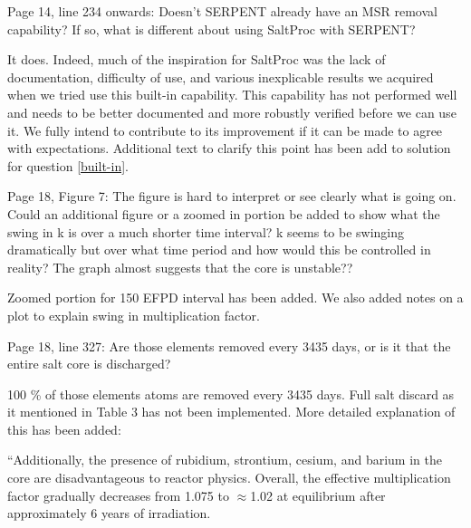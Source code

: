 \documentclass[answers,11pt]{exam}
\begin{document}
\begin{questions}
        \question  Page 14, line 234 onwards: Doesn't SERPENT already have an 
        MSR removal capability? If so, what is different about using SaltProc 
        with SERPENT?
        \begin{solution}
                It does. Indeed, much of the inspiration for SaltProc was the 
                lack of documentation, difficulty of use, and various 
                inexplicable results we acquired when we tried use this 
                built-in capability. This capability has not performed well and 
                needs to be better documented and more robustly verified before 
                we can use it. We fully intend to contribute to its improvement 
                if it can be made to agree with expectations.  Additional text 
                to clarify this point has been add to solution for question 
                \ref{built-in}.                
        \end{solution}

        \question  Page 18, Figure 7: The figure is hard to interpret or see 
        clearly what is going on. Could an additional figure or a zoomed in 
        portion be added to show what the swing in k is over a much shorter 
        time interval? k seems to be swinging dramatically but over what time 
        period and how would this be controlled in reality? The graph almost 
        suggests that the core is unstable??
        \begin{solution}
                Zoomed portion for 150 EFPD interval has been added. We also 
                added notes on a plot to explain swing in multiplication factor.
        \end{solution}

        \question  Page 18, line 327: Are those elements removed every 3435 
        days, or is it that the entire salt core is discharged?
        \begin{solution}
		        100 \% of those elements atoms are removed every 3435 
                        days. Full salt discard
		         as it mentioned in Table 3 has not been implemented. More detailed 
		         explanation of this has been added:


                        ``Additionally, the presence of rubidium, strontium, cesium, and barium in the
                        core are disadvantageous to reactor physics.
                        Overall, the effective multiplication factor gradually decreases from 1.075 to
                        $\approx$1.02 at equilibrium after approximately 6 years of irradiation.


\end{solution}
\end{questions}
\end{document}
